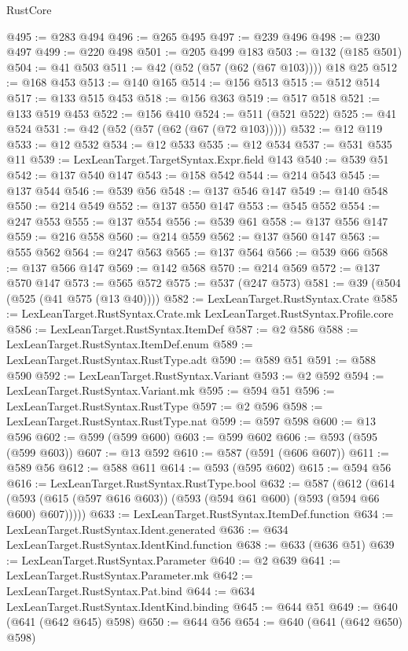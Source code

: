 \begin{lexlean}{RustCore}
\begin{coremodule}
@495 := @283 @494
@496 := @265 @495
@497 := @239 @496
@498 := @230 @497
@499 := @220 @498
@501 := @205 @499 @183
@503 := @132 (@185 @501)
@504 := @41 @503
@511 := @42 (@52 (@57 (@62 (@67 @103)))) @18 @25
@512 := @168 @453
@513 := @140 @165
@514 := @156 @513
@515 := @512 @514
@517 := @133 @515 @453
@518 := @156 @363
@519 := @517 @518
@521 := @133 @519 @453
@522 := @156 @410
@524 := @511 (@521 @522)
@525 := @41 @524
@531 := @42 (@52 (@57 (@62 (@67 (@72 @103)))))
@532 := @12 @119
@533 := @12 @532
@534 := @12 @533
@535 := @12 @534
@537 := @531 @535 @11
@539 := LexLeanTarget.TargetSyntax.Expr.field @143
@540 := @539 @51
@542 := @137 @540 @147
@543 := @158 @542
@544 := @214 @543
@545 := @137 @544
@546 := @539 @56
@548 := @137 @546 @147
@549 := @140 @548
@550 := @214 @549
@552 := @137 @550 @147
@553 := @545 @552
@554 := @247 @553
@555 := @137 @554
@556 := @539 @61
@558 := @137 @556 @147
@559 := @216 @558
@560 := @214 @559
@562 := @137 @560 @147
@563 := @555 @562
@564 := @247 @563
@565 := @137 @564
@566 := @539 @66
@568 := @137 @566 @147
@569 := @142 @568
@570 := @214 @569
@572 := @137 @570 @147
@573 := @565 @572
@575 := @537 (@247 @573)
@581 := @39 (@504 (@525 (@41 @575 (@13 @40))))
@582 := LexLeanTarget.RustSyntax.Crate
@585 := LexLeanTarget.RustSyntax.Crate.mk LexLeanTarget.RustSyntax.Profile.core
@586 := LexLeanTarget.RustSyntax.ItemDef
@587 := @2 @586
@588 := LexLeanTarget.RustSyntax.ItemDef.enum
@589 := LexLeanTarget.RustSyntax.RustType.adt
@590 := @589 @51
@591 := @588 @590
@592 := LexLeanTarget.RustSyntax.Variant
@593 := @2 @592
@594 := LexLeanTarget.RustSyntax.Variant.mk
@595 := @594 @51
@596 := LexLeanTarget.RustSyntax.RustType
@597 := @2 @596
@598 := LexLeanTarget.RustSyntax.RustType.nat
@599 := @597 @598
@600 := @13 @596
@602 := @599 (@599 @600)
@603 := @599 @602
@606 := @593 (@595 (@599 @603))
@607 := @13 @592
@610 := @587 (@591 (@606 @607))
@611 := @589 @56
@612 := @588 @611
@614 := @593 (@595 @602)
@615 := @594 @56
@616 := LexLeanTarget.RustSyntax.RustType.bool
@632 := @587
    (@612 (@614 (@593 (@615 (@597 @616 @603)) (@593 (@594 @61 @600) (@593 (@594 @66 @600) @607)))))
@633 := LexLeanTarget.RustSyntax.ItemDef.function
@634 := LexLeanTarget.RustSyntax.Ident.generated
@636 := @634 LexLeanTarget.RustSyntax.IdentKind.function
@638 := @633 (@636 @51)
@639 := LexLeanTarget.RustSyntax.Parameter
@640 := @2 @639
@641 := LexLeanTarget.RustSyntax.Parameter.mk
@642 := LexLeanTarget.RustSyntax.Pat.bind
@644 := @634 LexLeanTarget.RustSyntax.IdentKind.binding
@645 := @644 @51
@649 := @640 (@641 (@642 @645) @598)
@650 := @644 @56
@654 := @640 (@641 (@642 @650) @598)

\end{coremodule}
\end{lexlean}

